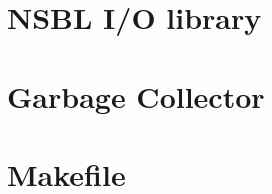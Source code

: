 \documentclass[letterpaper, 10pt]{article}
\begin{document}
\section{NSBL I/O library}







\section{Garbage Collector }



\section{Makefile}


\end{document}
